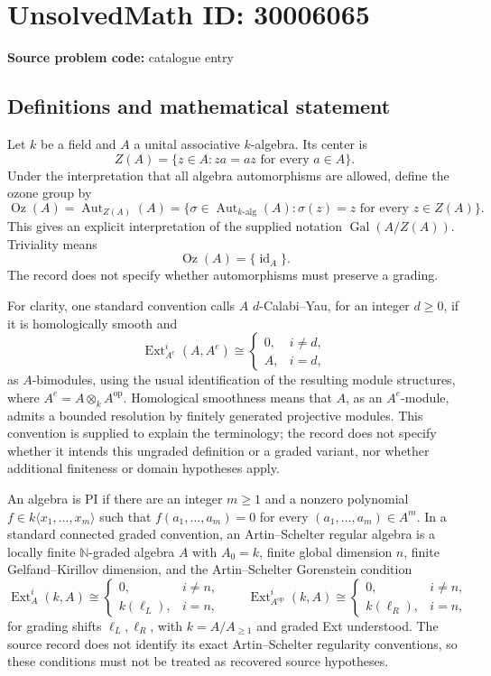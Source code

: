 \documentclass[11pt]{article}
\newcommand{\N}{\mathbb{N}}
\begin{document}
\section*{UnsolvedMath ID: 30006065}
\textbf{Source problem code:} catalogue entry
\subsection{Definitions and mathematical statement}
Let \(k\) be a field and \(A\) a unital associative \(k\)-algebra. Its center is
\[
Z(A)=\{z\in A:za=az\text{ for every }a\in A\}.
\]
Under the interpretation that all algebra automorphisms are allowed, define the ozone group by
\[
\operatorname{Oz}(A)=\operatorname{Aut}_{Z(A)}(A)
=\{\sigma\in\operatorname{Aut}_{k\text{-alg}}(A):\sigma(z)=z\text{ for every }z\in Z(A)\}.
\]
This gives an explicit interpretation of the supplied notation \(\operatorname{Gal}(A/Z(A))\). Triviality means
\[
\operatorname{Oz}(A)=\{\operatorname{id}_A\}.
\]
The record does not specify whether automorphisms must preserve a grading.

For clarity, one standard convention calls \(A\) \(d\)-Calabi--Yau, for an integer \(d\geq 0\), if it is homologically smooth and
\[
\operatorname{Ext}^{i}_{A^e}(A,A^e)\cong
\begin{cases}
0,&i\ne d,\\
A,&i=d,
\end{cases}
\]
as \(A\)-bimodules, using the usual identification of the resulting module structures, where \(A^e=A\otimes_k A^{\mathrm{op}}\). Homological smoothness means that \(A\), as an \(A^e\)-module, admits a bounded resolution by finitely generated projective modules. This convention is supplied to explain the terminology; the record does not specify whether it intends this ungraded definition or a graded variant, nor whether additional finiteness or domain hypotheses apply.

An algebra is PI if there are an integer \(m\geq1\) and a nonzero polynomial \(f\in k\langle x_1,\ldots,x_m\rangle\) such that \(f(a_1,\ldots,a_m)=0\) for every \((a_1,\ldots,a_m)\in A^m\). In a standard connected graded convention, an Artin--Schelter regular algebra is a locally finite \(\N\)-graded algebra \(A\) with \(A_0=k\), finite global dimension \(n\), finite Gelfand--Kirillov dimension, and the Artin--Schelter Gorenstein condition
\[
\operatorname{Ext}^{i}_{A}(k,A)\cong
\begin{cases}0,&i\ne n,\\k(\ell_L),&i=n,\end{cases}
\qquad
\operatorname{Ext}^{i}_{A^{\mathrm{op}}}(k,A)\cong
\begin{cases}0,&i\ne n,\\k(\ell_R),&i=n,\end{cases}
\]
for grading shifts \(\ell_L,\ell_R\), with \(k=A/A_{\geq1}\) and graded Ext understood. The source record does not identify its exact Artin--Schelter regularity conventions, so these conditions must not be treated as recovered source hypotheses.
\end{document}
